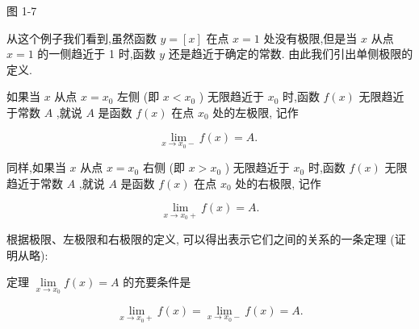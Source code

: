 \documentclass[lang=cn,newtx,10pt,scheme=chinese]{elegantbook}
\begin{document}
图 1-7

从这个例子我们看到,虽然函数 \(y = \left\lbrack x\right\rbrack\) 在点 \(x = 1\) 处没有极限,但是当 \(x\) 从点 \(x = 1\) 的一侧趋近于 1 时,函数 \(y\) 还是趋近于确定的常数. 由此我们引出单侧极限的定义.

如果当 \(x\) 从点 \(x = {x}_{0}\) 左侧 (即 \(x < {x}_{0}\) ) 无限趋近于 \({x}_{0}\) 时,函数 \(f\left( x\right)\) 无限趋近于常数 \(A\) ,就说 \(A\) 是函数 \(f\left( x\right)\) 在点 \({x}_{0}\) 处的左极限, 记作

\[
\mathop{\lim }\limits_{{x \rightarrow {x}_{0} - }}f\left( x\right) = A\text{. }
\]

同样,如果当 \(x\) 从点 \(x = {x}_{0}\) 右侧 (即 \(x > {x}_{0}\) ) 无限趋近于 \({x}_{0}\) 时,函数 \(f\left( x\right)\) 无限趋近于常数 \(A\) ,就说 \(A\) 是函数 \(f\left( x\right)\) 在点 \({x}_{0}\) 处的右极限, 记作

\[
\mathop{\lim }\limits_{{x \rightarrow {x}_{0} + }}f\left( x\right) = A.
\]

根据极限、左极限和右极限的定义, 可以得出表示它们之间的关系的一条定理 (证明从略):

定理 \(\mathop{\lim }\limits_{{x \rightarrow {x}_{0}}}f\left( x\right) = A\) 的充要条件是

\[
\mathop{\lim }\limits_{{x \rightarrow {x}_{0} + }}f\left( x\right) = \mathop{\lim }\limits_{{x \rightarrow {x}_{0} - }}f\left( x\right) = A.
\]
\end{document}
